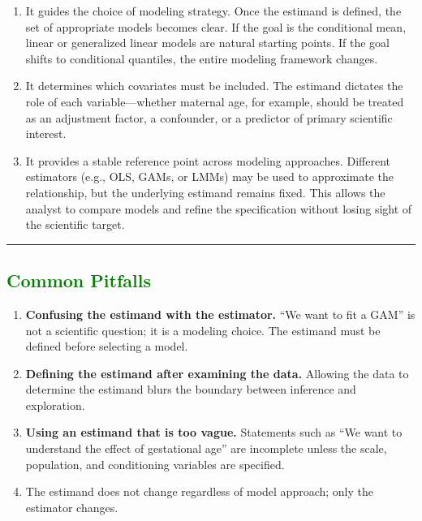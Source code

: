 \documentclass[
  letterpaper,
  DIV=11,
  numbers=noendperiod]{scrreprt}
\begin{document}
\begin{enumerate}
\def\labelenumi{\arabic{enumi}.}
\item
  It guides the choice of modeling strategy. Once the estimand is
  defined, the set of appropriate models becomes clear. If the goal is
  the conditional mean, linear or generalized linear models are natural
  starting points. If the goal shifts to conditional quantiles, the
  entire modeling framework changes.
\item
  It determines which covariates must be included. The estimand dictates
  the role of each variable---whether maternal age, for example, should
  be treated as an adjustment factor, a confounder, or a predictor of
  primary scientific interest.
\item
  It provides a stable reference point across modeling approaches.
  Different estimators (e.g., OLS, GAMs, or LMMs) may be used to
  approximate the relationship, but the underlying estimand remains
  fixed. This allows the analyst to compare models and refine the
  specification without losing sight of the scientific target.
\end{enumerate}

\begin{center}\rule{0.5\linewidth}{0.5pt}\end{center}

\hypertarget{section-52}{%
\subsection*{\texorpdfstring{\textcolor{green}{Common Pitfalls}}{}}\label{section-52}}

\begin{enumerate}
\def\labelenumi{\arabic{enumi}.}
\item
  \textbf{Confusing the estimand with the estimator.} ``We want to fit a
  GAM'' is not a scientific question; it is a modeling choice. The
  estimand must be defined before selecting a model.
\item
  \textbf{Defining the estimand after examining the data.} Allowing the
  data to determine the estimand blurs the boundary between inference
  and exploration.
\item
  \textbf{Using an estimand that is too vague.} Statements such as ``We
  want to understand the effect of gestational age'' are incomplete
  unless the scale, population, and conditioning variables are
  specified.
\item
  The estimand does not change regardless of model approach; only the
  estimator changes.
\end{enumerate}
\end{document}
